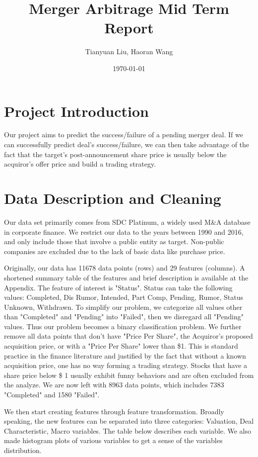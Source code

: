 \documentclass[a4paper]{article}
\title{Merger Arbitrage Mid Term Report}
\author{Tianyuan Liu, Haoran Wang}
\date{\today}
\begin{document}
\maketitle

\section{Project Introduction}
\label{sec:idea}

Our project aims to predict the success/failure of a pending merger deal. If we can successfully predict deal's success/failure, we can then take advantage of the fact that the target’s post-announcement share price is usually below the acquiror's offer price and build a trading strategy. 

\section{Data Description and Cleaning }
\label{sec:data}

Our data set primarily comes from SDC Platinum, a widely used M\&A database in corporate finance. We restrict our data to the years between 1990 and 2016, and only include those that involve a public entity as target. Non-public companies are excluded due to the lack of basic data like purchase price.

Originally, our data has 11678 data points (rows) and 29 features (columns). A shortened summary table of the features and brief description is available at the Appendix. The feature of interest is "Status". Status can take the following values: Completed, Dis Rumor, Intended, Part Comp, Pending, Rumor, Status Unknown, Withdrawn. To simplify our problem, we categorize all values other than "Completed" and "Pending" into "Failed", then we disregard all "Pending" values. Thus our problem becomes a binary classification problem. We further remove all data points that don't have "Price Per Share", the Acquiror's proposed acquisition price, or with a "Price Per Share" lower than \$1. This is standard practice in the finance literature and justified by the fact that without a known acquisition price, one has no way forming a trading strategy. Stocks that have a share price below \$ 1 usually exhibit funny behaviors and are often excluded from the analyze. We are now left with 8963 data points, which includes 7383 "Completed" and 1580 "Failed".

We then start creating features through feature transformation. Broadly speaking, the new features can be separated into three categories: Valuation, Deal Characteristic, Macro variables. The table below describes each variable. We also made histogram plots of various variables to get a sense of the variables distribution.
\end{document}
